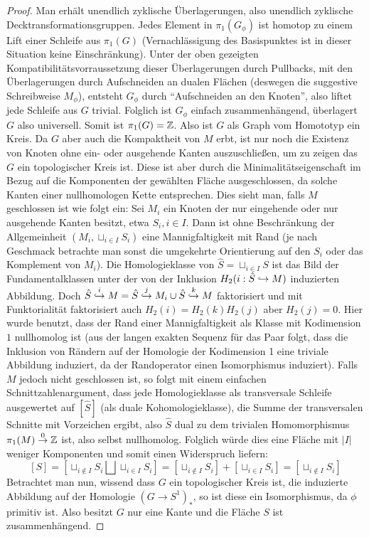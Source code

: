 \begin{proof}
	 Man erhält unendlich zyklische Überlagerungen, also unendlich zyklische Decktransformationsgruppen. Jedes Element in $\pi_1(G_\phi)$ ist homotop zu einem Lift einer Schleife  aus $\pi_1(G)$ (Vernachlässigung des Basispunktes ist in dieser Situation keine Einschränkung). Unter der oben gezeigten Kompatibilitätsvorraussetzung dieser Überlagerungen durch Pullbacks, mit den Überlagerungen durch Aufschneiden an dualen Flächen (deswegen die suggestive Schreibweise $M_\phi$), entsteht $G_\phi$ durch "`Aufschneiden an den Knoten"', also liftet jede Schleife aus $G$ trivial. Folglich ist $G_\phi$ einfach zusammenhängend, überlagert $G$ also universell. Somit ist $\pi_1(G)= \mathbb{Z}$. Also ist $G$ als Graph vom Homototyp ein Kreis. Da $G$ aber auch die Kompaktheit von $M$ erbt, ist nur noch die Existenz von Knoten ohne ein- oder ausgehende Kanten auszuschließen, um zu zeigen das $G$ ein topologischer Kreis ist. Diese ist aber durch die Minimalitätseigenschaft im Bezug auf die Komponenten der gewählten Fläche ausgeschlossen, da solche Kanten einer nullhomologen Kette entsprechen. Dies sieht man, falls $M$ geschlossen ist wie folgt ein: Sei $M_i$ ein Knoten der nur eingehende oder nur ausgehende Kanten besitzt, etwa $S_i, i \in I$. Dann ist ohne Beschränkung der Allgemeinheit $(M_i,\sqcup_{i\in I}S_i)$ eine Mannigfaltigkeit mit Rand (je nach Geschmack betrachte man sonst die umgekehrte Orientierung auf den $S_i$ oder das Komplement von $M_i$). Die Homologieklasse von $\hat S = \sqcup_{i \in I} S$ ist das Bild der Fundamentalklassen unter der von der Inklusion $H_2(i:\hat S \hookrightarrow M)$ induzierten Abbildung. Doch $ \hat S \stackrel i {\hookrightarrow} M = \hat S \stackrel j {\hookrightarrow} M_i \cup \hat S \stackrel k {\hookrightarrow} M$ faktorisiert und mit Funktorialität faktorisiert auch $H_2(i)=H_2(k)H_2(j)$ aber $H_2(j)=0$. Hier wurde benutzt, dass der Rand einer Mannigfaltigkeit als Klasse mit Kodimension $1$ nullhomolog ist (aus der langen exakten Sequenz für das Paar folgt, dass die Inklusion von Rändern auf der Homologie der Kodimension 1 eine triviale Abbildung induziert, da der Randoperator einen Isomorphismus induziert). Falls $M$ jedoch nicht geschlossen ist, so folgt mit einem einfachen Schnittzahlenargument, dass jede Homologieklasse als transversale Schleife ausgewertet auf $[\hat S]$ (als duale Kohomologieklasse), die Summe der transversalen Schnitte mit Vorzeichen ergibt, also $\hat S$ dual zu dem trivialen Homomorphismus $\pi_1(M) \stackrel 0\to \mathbb{Z}$ ist, also selbst nullhomolog. Folglich würde dies eine Fläche mit $|I|$ weniger Komponenten und somit einen Widerspruch liefern:
	 \[
	 	[S]=[\sqcup_{i\not \in I} S_i\bigsqcup \sqcup_{i\in I} S_i] = [\sqcup_{i\not \in I} S_i ]+[ \sqcup_{i\in I} S_i] = [\sqcup_{i\not \in I}S_i]
	 \]
	 Betrachtet man nun, wissend dass $G$ ein topologischer Kreis ist, die induzierte Abbildung auf der Homologie $(G\to S^1)_*$, so ist diese ein Isomorphismus, da $\phi$ primitiv ist. Also besitzt $G$ nur eine Kante und die Fläche $S$ ist zusammenhängend.


\end{proof}
